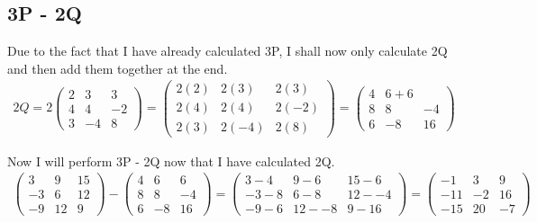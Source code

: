 \documentclass[a4paper,10pt]{article}
\begin{document}
    \subsection{3P - 2Q}
    Due to the fact that I have already calculated 3P, I shall now only calculate 2Q and then add them together at the end.
      \begin{align*}
        2Q =
        2
        \begin{pmatrix}
          2 & 3 & 3\\
          4 & 4 & -2\\
          3 & -4 & 8
        \end{pmatrix}
        =
        \begin{pmatrix}
          2(2) & 2(3) & 2(3)\\
          2(4) & 2(4) & 2(-2)\\
          2(3) & 2(-4) & 2(8)
        \end{pmatrix}
        =
        \begin{pmatrix}
          4 & 6 + 6\\
          8 & 8 & -4\\
          6 & -8 & 16
        \end{pmatrix}
      \end{align*}

      Now I will perform 3P - 2Q now that I have calculated 2Q.
      \begin{align*}
        \begin{pmatrix}
          3 & 9 & 15\\
          -3 & 6 & 12\\
          -9 & 12 & 9
        \end{pmatrix}
        -
        \begin{pmatrix}
          4 & 6 & 6\\
          8 & 8 & -4\\
          6 & -8 & 16
        \end{pmatrix}
        =
        \begin{pmatrix}
          3 - 4 & 9 - 6 & 15 - 6\\
          -3 - 8 & 6 - 8 & 12 - -4\\
          -9 - 6 & 12 - -8 & 9 - 16
        \end{pmatrix}
        =
        \begin{pmatrix}
          -1 & 3 & 9\\
          -11 & -2 & 16\\
          -15 & 20 & -7
        \end{pmatrix}
      \end{align*}
\end{document}
